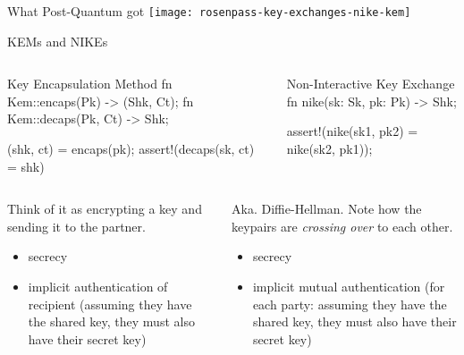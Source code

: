 \begin{frame}{What Post-Quantum got}
  \texttt{[image: rosenpass-key-exchanges-nike-kem]}
\end{frame}



\begin{frame}[fragile,T]{KEMs and NIKEs}
\small
  \begin{columns}[t,fullwidth]
\hfill
    \begin{column}{.47\linewidth}
\begin{rustblock}{Key Encapsulation Method}
fn Kem::encaps(Pk) -> (Shk, Ct);
fn Kem::decaps(Pk, Ct) -> Shk;

(shk, ct) = encaps(pk);
assert!(decaps(sk, ct) = shk)
\end{rustblock}
\end{column}
\hfill
\begin{column}{.47\linewidth}
\begin{rustblock}{Non-Interactive Key Exchange}
fn nike(sk: Sk, pk: Pk) -> Shk;

assert!(nike(sk1, pk2) =
        nike(sk2, pk1));
\end{rustblock}
\end{column}\hfill
\end{columns}
\begin{columns}[t,fullwidth]
\hfill
\begin{column}{.47\linewidth}
  Think of it as encrypting a key and sending it
        to the partner.

        \begin{itemize}
          \item secrecy
          \item implicit authentication of recipient
            (assuming they have the shared key, they must
            also have their secret key)
        \end{itemize}
\end{column}
\hfill
\begin{column}{.47\linewidth}
        Aka. Diffie-Hellman. Note how the
        keypairs are \emph{crossing over} to each other.

        \begin{itemize}
          \item secrecy
          \item implicit mutual authentication
            (for each party: assuming they have the shared key, they must
            also have their secret key)
        \end{itemize}
    \end{column}
    \hfill\strut
  \end{columns}
\end{frame}


